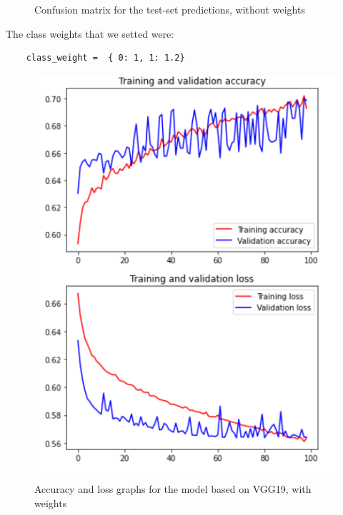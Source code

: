 \documentclass[11pt,a4paper,oneside]{article}
\begin{document}
\begin{figure}[h]
\begin{minipage}[c]{.4\textwidth}
		\caption{Confusion matrix for the test-set predictions, without weights}
		\label{fig:vgg19_3.2_matrix}
	\end{minipage}%
\end{figure}

The class weights that we setted were: 
\begin{verbatim}
    class_weight =  { 0: 1, 1: 1.2}
\end{verbatim}

\begin{figure}[h]
\centering
	\begin{minipage}[c]{.4\textwidth}
		\centering\setlength{\captionmargin}{0pt}%
		\includegraphics[width=.9\textwidth]{images/Task 3/VGG19 3.2/With Weights/Accuracy}
		\caption{Accuracy and loss graphs for the model based on VGG19, with weights}
		\label{fig:vgg19_3.2_accuracy}
	\end{minipage}
	\hspace{5mm}%
	\begin{minipage}[c]{.4\textwidth}
		\centering\setlength{\captionmargin}{0pt}%

\end{minipage}
\end{figure}
\end{document}
